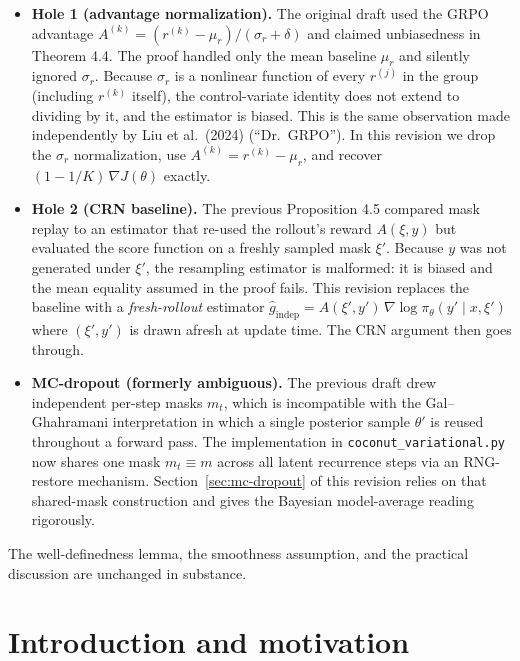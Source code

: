 \documentclass[11pt]{article}
\theoremstyle{definition}
\theoremstyle{remark}
\begin{document}
\begin{itemize}[topsep=2pt,itemsep=2pt]
\item \textbf{Hole 1 (advantage normalization).}  The original draft used
      the GRPO advantage
      $A^{(k)} = (r^{(k)} - \mu_r)/(\sigma_r + \delta)$
      and claimed unbiasedness in Theorem 4.4.  The proof handled only the
      mean baseline $\mu_r$ and silently ignored $\sigma_r$.  Because
      $\sigma_r$ is a nonlinear function of every $r^{(j)}$ in the group
      (including $r^{(k)}$ itself), the control-variate identity does not
      extend to dividing by it, and the estimator is biased.  This is the
      same observation made independently by Liu et al.\ (2024)
      (``Dr.\ GRPO'').  In this revision we drop the $\sigma_r$
      normalization, use $A^{(k)} = r^{(k)} - \mu_r$, and recover
      $(1 - 1/K)\,\nabla J(\theta)$ exactly.
\item \textbf{Hole 2 (CRN baseline).}  The previous Proposition 4.5
      compared mask replay to an estimator that re-used the rollout's
      reward $A(\xi,y)$ but evaluated the score function on a freshly
      sampled mask $\xi'$.  Because $y$ was not generated under $\xi'$,
      the resampling estimator is malformed: it is biased and the mean
      equality assumed in the proof fails.  This revision replaces the
      baseline with a \emph{fresh-rollout} estimator
      $\hat g_{\mathrm{indep}} = A(\xi',y')\,\nabla \log \pi_\theta(y'\mid x,\xi')$
      where $(\xi',y')$ is drawn afresh at update time.  The CRN argument
      then goes through.
\item \textbf{MC-dropout (formerly ambiguous).}  The previous draft drew
      independent per-step masks $m_t$, which is incompatible with the
      Gal--Ghahramani interpretation in which a single posterior sample
      $\theta'$ is reused throughout a forward pass.  The implementation
      in \texttt{coconut\_variational.py} now shares one mask
      $m_t \equiv m$ across all latent recurrence steps via an
      RNG-restore mechanism.  Section~\ref{sec:mc-dropout} of this
      revision relies on that shared-mask construction and gives the
      Bayesian model-average reading rigorously.
\end{itemize}

The well-definedness lemma, the smoothness assumption, and the practical
discussion are unchanged in substance.

\section{Introduction and motivation}
\end{document}
